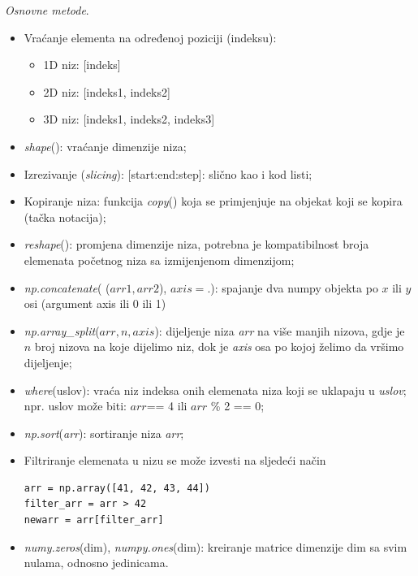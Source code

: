 \textit{Osnovne metode}.
\begin{itemize}
	\item  Vraćanje elementa na određenoj poziciji (indeksu): 
	\begin{itemize}
		\item 1D niz:  [indeks]
		\item 2D niz:  [indeks1, indeks2]
		\item 3D niz: [indeks1, indeks2, indeks3]
	\end{itemize}
    \item \textit{shape}(): vraćanje dimenzije niza;  
    \item Izrezivanje (\textit{slicing}):  [start:end:step]: slično kao i kod listi; 
    \item Kopiranje niza: funkcija \textit{copy}() koja se primjenjuje na objekat koji se kopira (tačka notacija);
    \item \textit{reshape}(): promjena dimenzije niza, potrebna je kompatibilnost broja
    elemenata početnog niza sa izmijenjenom dimenzijom; 
    \item \textit{np.concatenate}( ($arr1, arr2$), $axis=$.): spajanje dva numpy objekta   
    po $x$ ili $y$ osi (argument axis ili 0 ili 1) 
    \item  \textit{np.array\_split}($arr, n, axis$): dijeljenje niza \textit{arr} na više manjih nizova, gdje je $n$ broj nizova na koje dijelimo niz, dok je  \textit{axis} osa po kojoj želimo da vršimo dijeljenje;
    \item  \textit{where}(uslov): vraća niz indeksa onih elemenata niza koji se uklapaju u \textit{uslov}; npr. uslov može biti: $arr$== 4 ili $arr$ \% 2 == 0;
    \item \textit{np.sort}(\emph{arr}): sortiranje niza \emph{arr};
    \item Filtriranje elemenata u nizu se može izvesti na sljedeći način
    \begin{verbatim}
arr = np.array([41, 42, 43, 44])
filter_arr = arr > 42
newarr = arr[filter_arr]
    \end{verbatim}
    \item \textit{numy.zeros}(dim), \textit{numpy.ones}(dim): kreiranje matrice dimenzije dim sa svim nulama, odnosno jedinicama.
\end{itemize}


